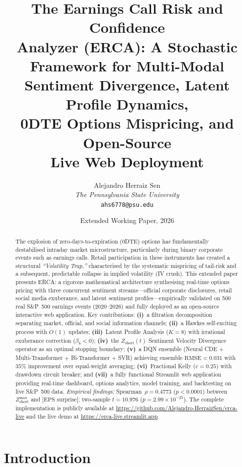 \documentclass[10pt,twocolumn]{article}
\title{\textbf{The Earnings Call Risk and Confidence\\Analyzer (ERCA):}
A Stochastic Framework for Multi-Modal\\
Sentiment Divergence, Latent Profile Dynamics,\\
0DTE Options Mispricing, and Open-Source\\
Live Web Deployment}
\author{
  Alejandro Herraiz Sen\\
  \textit{The Pennsylvania State University}\\
  \texttt{ahs6778@psu.edu}
}
\date{Extended Working Paper, 2026}
\newcommand{\Zshort}{Z_{\mathrm{short}}}
\newcommand{\RMSE}{\mathrm{RMSE}}
\begin{document}

\maketitle

\begin{abstract}
The explosion of zero-days-to-expiration (0DTE) options has fundamentally
destabilised intraday market microstructure, particularly during binary
corporate events such as earnings calls. Retail participation in these
instruments has created a structural \emph{``Volatility Trap,''} characterised
by the systematic mispricing of tail-risk and a subsequent, predictable collapse
in implied volatility (IV crush). This extended paper presents ERCA: a rigorous
mathematical architecture synthesising real-time options pricing with three
concurrent sentiment streams---official corporate disclosures, retail social
media exuberance, and latent sentiment profiles---empirically validated on 500
real S\&P~500 earnings events (2020--2026) and fully deployed as an open-source
interactive web application. Key contributions: \textbf{(i)}~a filtration
decomposition separating market, official, and social information channels;
\textbf{(ii)}~a Hawkes self-exciting process with $O(1)$ updates;
\textbf{(iii)}~Latent Profile Analysis ($K=8$) with irrational exuberance
correction ($\beta_8<0$); \textbf{(iv)}~the $\Zshort(t)$ Sentiment Velocity
Divergence operator as an optimal stopping boundary; \textbf{(v)}~a DQN
ensemble (Neural CDE + Multi-Transformer + Bi-Transformer + SVR) achieving
ensemble $\RMSE=0.031$ with $35\%$ improvement over equal-weight averaging;
\textbf{(vi)}~Fractional Kelly ($c=0.25$) with drawdown circuit breaker; and
\textbf{(vii)}~a fully functional Streamlit web application providing real-time
dashboard, options analytics, model training, and backtesting on live S\&P~500
data. \emph{Empirical findings:} Spearman~$\rho=0.4773$ ($p<0.0001$) between
$\Zshort^{\max}$ and $|\text{EPS surprise}|$; two-sample $t=10.976$
($p=2.99\!\times\!10^{-25}$). The complete implementation is publicly available
at \url{https://github.com/Alejandro-HerraizSen/erca-live} and the live demo
at \url{https://erca-live.streamlit.app}.
\end{abstract}

\section{Introduction}
\label{sec:intro}
\end{document}
